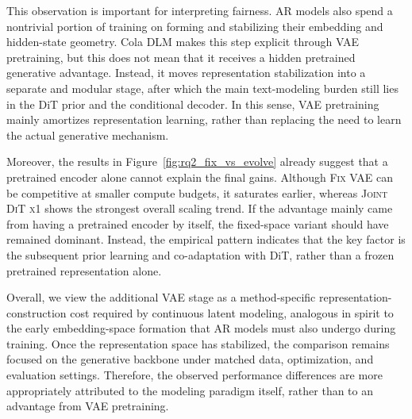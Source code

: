 This observation is important for interpreting fairness. AR models also spend a nontrivial portion of training on forming and stabilizing their embedding and hidden-state geometry. Cola DLM makes this step explicit through VAE pretraining, but this does not mean that it receives a hidden pretrained generative advantage. Instead, it moves representation stabilization into a separate and modular stage, after which the main text-modeling burden still lies in the DiT prior and the conditional decoder. In this sense, VAE pretraining mainly amortizes representation learning, rather than replacing the need to learn the actual generative mechanism.

Moreover, the results in Figure~\ref{fig:rq2_fix_vs_evolve} already suggest that a pretrained encoder alone cannot explain the final gains. Although \textsc{Fix VAE} can be competitive at smaller compute budgets, it saturates earlier, whereas \textsc{Joint DiT x1} shows the strongest overall scaling trend. If the advantage mainly came from having a pretrained encoder by itself, the fixed-space variant should have remained dominant. Instead, the empirical pattern indicates that the key factor is the subsequent prior learning and co-adaptation with DiT, rather than a frozen pretrained representation alone.

Overall, we view the additional VAE stage as a method-specific representation-construction cost required by continuous latent modeling, analogous in spirit to the early embedding-space formation that AR models must also undergo during training. Once the representation space has stabilized, the comparison remains focused on the generative backbone under matched data, optimization, and evaluation settings. Therefore, the observed performance differences are more appropriately attributed to the modeling paradigm itself, rather than to an advantage from VAE pretraining.

